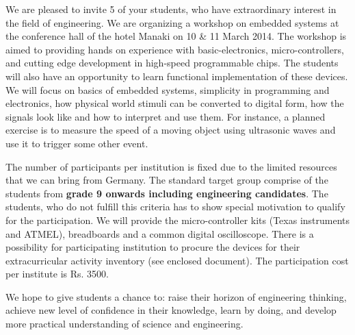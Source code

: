 \documentclass[11pt,stdletter,dateno,sigleft]{newlfm} %
\begin{document}
\begin{newlfm}

We are pleased to invite 5 of your students, who have extraordinary interest in the field of engineering. We are organizing a workshop on embedded systems at the conference hall of the hotel Manaki on 10 \& 11 March 2014. The workshop is aimed to providing hands on experience with basic-electronics, micro-controllers, and cutting edge development in high-speed programmable chips. The students will also have an opportunity to learn functional implementation of these devices. We will focus on basics of embedded systems, simplicity in programming and electronics, how physical world stimuli can be converted to digital form, how the signals look like and how to interpret and use them. For instance, a planned exercise is to measure the speed of a moving object using ultrasonic waves and use it to trigger some other event.
 
The number of participants per institution is fixed due to the limited resources that we can bring from Germany. The standard target group comprise of the students from \textbf{grade 9 onwards including engineering candidates}. The students, who do not fulfill this criteria has to show special motivation to qualify for the participation. We will provide the micro-controller kits (Texas instruments and ATMEL), breadboards  and a common digital oscilloscope. There is a possibility for participating institution to procure the devices for their extracurricular activity inventory (see enclosed document). The participation cost per institute is Rs. 3500. 

We hope to give students a chance to: raise their horizon of engineering thinking, achieve new level of confidence in their knowledge, learn by doing, and develop more practical understanding of science and engineering.\\[5pt]
\end{newlfm}
\end{document}
